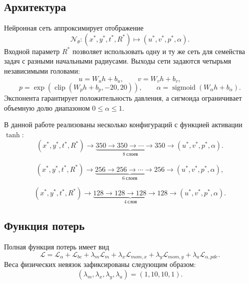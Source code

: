 \documentclass[12pt,a4paper]{article}
\begin{document}
\subsection{Архитектура}

Нейронная сеть аппроксимирует отображение
\[
    \mathcal{N}_\theta:
    (x^*,y^*,t^*,R^*)\mapsto (u^*,v^*,p^*,\alpha).
\]
Входной параметр \(R^*\) позволяет использовать одну и ту же сеть для семейства
задач с разными начальными радиусами. Выходы сети задаются четырьмя независимыми
головами:
\[
    u = W_u h + b_u,
    \qquad
    v = W_v h + b_v,
\]
\[
    p = \exp\left(\operatorname{clip}(W_p h+b_p,-20,20)\right),
    \qquad
    \alpha=\operatorname{sigmoid}(W_\alpha h+b_\alpha).
\]
Экспонента гарантирует положительность давления, а сигмоида ограничивает
объемную долю диапазоном \(0\leq\alpha\leq1\).

В данной работе реализованы несколько конфигураций с функцией активации \(\tanh\):
\[
    (x^*,y^*,t^*,R^*) \rightarrow
    \underbrace{350 \rightarrow 350 \rightarrow \cdots \rightarrow 350}_{8\ \text{слоев}}
    \rightarrow
    (u^*,v^*,p^*,\alpha).
\]

\[
    (x^*,y^*,t^*,R^*) \rightarrow
    \underbrace{256 \rightarrow 256 \rightarrow \cdots \rightarrow 256}_{6\ \text{слоев}}
    \rightarrow
    (u^*,v^*,p^*,\alpha),
\]

\[
    (x^*,y^*,t^*,R^*) \rightarrow
    \underbrace{128 \rightarrow 128 \rightarrow 128 \rightarrow 128}_{4\ \text{слоя}}
    \rightarrow
    (u^*,v^*,p^*,\alpha).
\]

\subsection{Функция потерь}

Полная функция потерь имеет вид
\begin{equation}
    \mathcal{L}
    =
    \mathcal{L}_\alpha
    +
    \mathcal{L}_{bc}
    +
    \lambda_m\mathcal{L}_m
    +
    \lambda_x\mathcal{L}_{mom,x}
    +
    \lambda_y\mathcal{L}_{mom,y}
    +
    \lambda_a\mathcal{L}_{\alpha,pde}.
    \label{eq:loss_total}
\end{equation}
Веса физических невязок зафиксированы следующим образом:
\[
    (\lambda_m,\lambda_x,\lambda_y,\lambda_a)=(1,10,10,1).
\]
\end{document}
